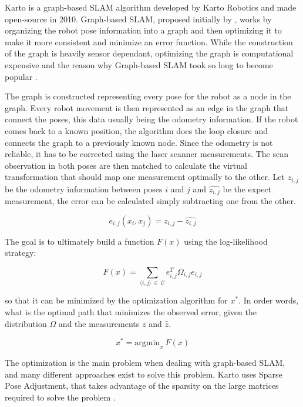 Karto is a graph-based SLAM algorithm developed by Karto Robotics and made open-source in 2010. Graph-based SLAM, proposed initially by \citeauthor{lu1997globally}, works by organizing the robot pose information into a graph and then optimizing it to make it more consistent and minimize an error function. While the construction of the graph is heavily sensor dependant, optimizing the graph is computational expensive and the reason why Graph-based SLAM took so long to become popular \cite{grisetti2010tutorial}.

The graph is constructed representing every pose for the robot as a node in the graph. Every robot movement is then represented as an edge in the graph that connect the poses, this data usually being the odometry information. If the robot comes back to a known position, the algorithm does the loop closure and connects the graph to a previously known node. Since the odometry is not reliable, it has to be corrected using the laser scanner measurements. The scan observation in both poses are then matched to calculate the virtual transformation that should map one measurement optimally to the other. Let $z_{i,j}$ be the odometry information between poses $i$ and $j$ and $\hat{z_{i,j}}$ be the expect measurement, the error can be calculated simply subtracting one from the other.

\begin{equation}
    e_{i,j}(x_i, x_j) = z_{i,j} - \hat{z_{i,j}}
\end{equation}

The goal is to ultimately build a function $F(x)$ using the log-likelihood strategy:

\begin{equation}
    F(x) = \sum_{\langle i, j \rangle \ \in \ \mathcal{C}} e_{i,j}^T \Omega_{i,j} e_{i,j}
\end{equation}

so that it can be minimized by the optimization algorithm for $x^*$. In order words, what is the optimal path that minimizes the observed error, given the distribution $\Omega$ and the measurements $z$ and $\hat{z}$.

\begin{equation}
    x^* = \text{argmin}_x \ F(x)
\end{equation}

The optimization is the main problem when dealing with graph-based SLAM, and many different approaches exist to solve this problem. Karto uses Sparse Pose Adjustment, that takes advantage of the sparsity on the large matrices required to solve the problem \cite{konolige2010efficient}.

